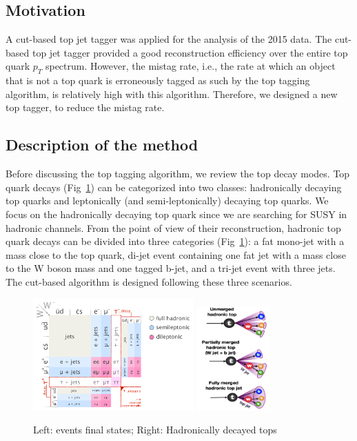 \subsection{Motivation}
A cut-based top jet tagger was applied for the analysis of the 2015 data\cite{CMS-PAS-SUS-16-030}. The cut-based top jet tagger provided a good reconstruction efficiency over the entire top quark $p_{T}$ spectrum. However, the mistag rate, i.e., the rate at which an object that is not a top quark is erroneously tagged as such by the top tagging algorithm, is relatively high with this algorithm. Therefore, we designed a new top tagger, to reduce the mistag rate. 

\subsection{Description of the method}
\label{sec:toptagger}

Before discussing the top tagging algorithm, we review the top decay modes. Top quark decays (Fig~\ref{fig:c4twdecaymod}) can be categorized into two classes: hadronically decaying top quarks and leptonically (and semi-leptonically) decaying top quarks. We focus on the hadronically decaying top quark since we are searching for SUSY in hadronic channels. From the point of view of their reconstruction, hadronic top quark decays can be divided into three categories (Fig~\ref{fig:c4twdecaymod}): a fat mono-jet with a mass close to the top quark, di-jet event containing one fat jet with a mass close to the W boson mass and one tagged b-jet, and a tri-jet event with three jets. The cut-based algorithm is designed following these three scenarios. 

\begin{figure}[htbp]
 \begin{center}
  \includegraphics[width=0.55\textwidth]{figures/c4/c4_top_w_decaymod.png}
  \includegraphics[width=0.25\textwidth]{figures/c4/c4_tagger_hadtopdecay.png}
 \end{center}
 \caption{Left: \ttbar events final states; Right: Hadronically decayed tops}
 \label{fig:c4twdecaymod}
\end{figure}

